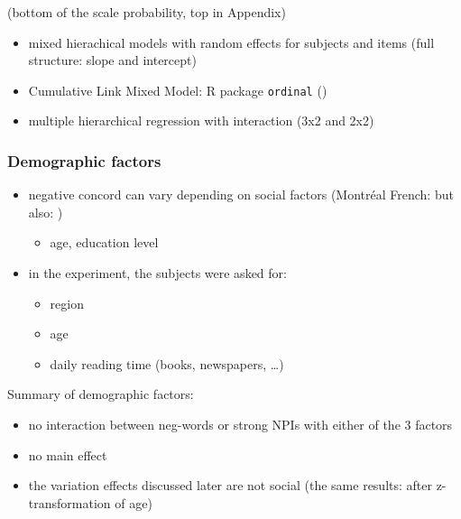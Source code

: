 \documentclass[
  letterpaper,
  DIV=11,
  numbers=noendperiod]{scrartcl}
\providecommand{\tightlist}{%
  \setlength{\itemsep}{0pt}\setlength{\parskip}{0pt}}\usepackage{longtable,booktabs,array}
\begin{document}
(bottom of the scale probability, top in Appendix)

\begin{itemize}
\tightlist
\item
  mixed hierachical models with random effects for subjects and items
  (full structure: slope and intercept)
\item
  Cumulative Link Mixed Model: R package \texttt{ordinal}
  (\textcite{r-ordinal})
\item
  multiple hierarchical regression with interaction (3x2 and 2x2)
\end{itemize}

\hypertarget{demographic-factors}{%
\subsubsection{Demographic factors}\label{demographic-factors}}

\begin{itemize}
\tightlist
\item
  negative concord can vary depending on social factors (Montréal
  French: \textcite{burnett2015variable} but also:
  \textcite{burnett2018structural})

  \begin{itemize}
  \tightlist
  \item
    age, education level
  \end{itemize}
\item
  in the experiment, the subjects were asked for:

  \begin{itemize}
  \tightlist
  \item
    region
  \item
    age
  \item
    daily reading time (books, newspapers, \ldots)
  \end{itemize}
\end{itemize}

Summary of demographic factors:

\begin{itemize}
\tightlist
\item
  no interaction between neg-words or strong NPIs with either of the 3
  factors
\item
  no main effect
\item
  the variation effects discussed later are not social (the same
  results: after z-transformation of age)
\end{itemize}
\end{document}
